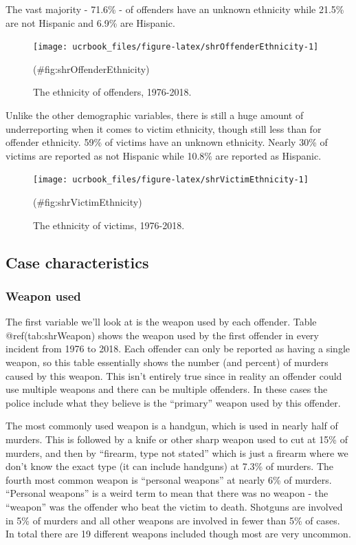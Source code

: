 \documentclass[
  12pt,
  openany]{book}
\begin{document}
The vast majority - 71.6\% - of offenders have an unknown ethnicity while 21.5\% are not Hispanic and 6.9\% are Hispanic.

\begin{figure}

{\centering \texttt{[image: ucrbook\_files/figure-latex/shrOffenderEthnicity-1]} 

}

\caption{The ethnicity of offenders, 1976-2018.}(\#fig:shrOffenderEthnicity)
\end{figure}

Unlike the other demographic variables, there is still a huge amount of underreporting when it comes to victim ethnicity, though still less than for offender ethnicity. 59\% of victims have an unknown ethnicity. Nearly 30\% of victims are reported as not Hispanic while 10.8\% are reported as Hispanic.

\begin{figure}

{\centering \texttt{[image: ucrbook\_files/figure-latex/shrVictimEthnicity-1]} 

}

\caption{The ethnicity of victims, 1976-2018.}(\#fig:shrVictimEthnicity)
\end{figure}

\hypertarget{case-characteristics}{%
\subsection{Case characteristics}\label{case-characteristics}}

\hypertarget{weapon-used}{%
\subsubsection{Weapon used}\label{weapon-used}}

The first variable we'll look at is the weapon used by each offender. Table @ref(tab:shrWeapon) shows the weapon used by the first offender in every incident from 1976 to 2018. Each offender can only be reported as having a single weapon, so this table essentially shows the number (and percent) of murders caused by this weapon. This isn't entirely true since in reality an offender could use multiple weapons and there can be multiple offenders. In these cases the police include what they believe is the ``primary'' weapon used by this offender.

The most commonly used weapon is a handgun, which is used in nearly half of murders. This is followed by a knife or other sharp weapon used to cut at 15\% of murders, and then by ``firearm, type not stated'' which is just a firearm where we don't know the exact type (it can include handguns) at 7.3\% of murders. The fourth most common weapon is ``personal weapons'' at nearly 6\% of murders. ``Personal weapons'' is a weird term to mean that there was no weapon - the ``weapon'' was the offender who beat the victim to death. Shotguns are involved in 5\% of murders and all other weapons are involved in fewer than 5\% of cases. In total there are 19 different weapons included though most are very uncommon.
\end{document}
